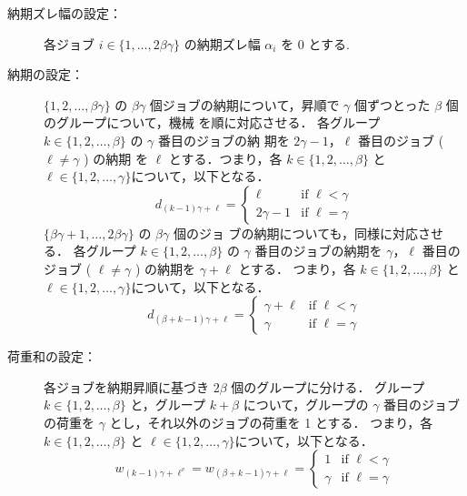 \documentclass[12pt]{optlab-bachelor}
\begin{document}
\begin{description}
  \item[納期ズレ幅の設定：]
  各ジョブ $i \in \{1,\ldots,2\beta \gamma\}$ の納期ズレ幅
  $\alpha_i$ を 0 とする.
  \item[納期の設定：] $\{1,2,\ldots, \beta \gamma\}$ の $\beta \gamma$ 個ジョブの納期について，昇順で $\gamma$ 個ずつとった $\beta$ 個のグループについて，機械
  を順に対応させる．
  各グループ $k \in \{1,2,\ldots, \beta\}$ の $\gamma$ 番目のジョブの納
  期を $2\gamma - 1$，$\ell$ 番目のジョブ ( $\ell \neq \gamma$ ) の納期
  を $\ell$ とする．つまり，各 $k \in \{1,2,\ldots, \beta\}$ と $\ell \in \{1,2,\ldots,
  \gamma\}$について，以下となる．
  \begin{displaymath}
    d_{(k - 1)\gamma + \ell} = \left\{ \begin{array}{ll} \ell & \text{if } \ell < \gamma \\ 2\gamma - 1 & \text{if } \ell = \gamma \end{array} \right.
  \end{displaymath}
  $\{\beta \gamma + 1,\ldots, 2\beta \gamma\}$ の $\beta \gamma$ 個のジョ
  ブの納期についても，同様に対応させる．
  各グループ $k \in \{1,2,\ldots, \beta\}$ の $\gamma$ 番目のジョブの納期を $\gamma$，$\ell$ 番目のジョブ ( $\ell \neq \gamma$ ) の納期を $\gamma + \ell$ とする．
  つまり，各 $k \in \{1,2,\ldots, \beta\}$ と $\ell \in \{1,2,\ldots,
  \gamma\}$について，以下となる．
  \begin{displaymath}
    d_{(\beta + k - 1)\gamma + \ell} = \left\{ \begin{array}{ll}\gamma +  \ell & \text{if } \ell < \gamma \\ \gamma & \text{if } \ell = \gamma \end{array} \right.
  \end{displaymath}
  \item[荷重和の設定：] 各ジョブを納期昇順に基づき $2\beta$ 個のグループに分ける．
  グループ $k \in \{1,2,\ldots,\beta\}$ と，グループ $k + \beta$ について，グループの $\gamma$ 番目のジョブの荷重を $\gamma$ とし，それ以外のジョブの荷重を 1 とする．
  つまり，各 $k \in \{1,2,\ldots, \beta\}$ と $\ell \in \{1,2,\ldots,
  \gamma\}$について，以下となる．
  \begin{displaymath}
    w_{(k - 1)\gamma + \ell^v} = w_{(\beta + k - 1)\gamma + \ell} = \left\{ \begin{array}{ll} 1 & \text{if } \ell < \gamma \\ \gamma & \text{if } \ell = \gamma \end{array} \right.

\end{displaymath}
\end{description}
\end{document}
